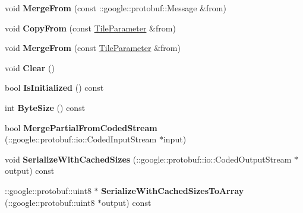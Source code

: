 \begin{DoxyCompactItemize}
void {\bfseries Merge\+From} (const \+::google\+::protobuf\+::\+Message \&from)
\item 
\mbox{\label{classcaffe_1_1_tile_parameter_af27dfd797341f31b2bee5f7fc8c348e7}} 
void {\bfseries Copy\+From} (const \mbox{\hyperlink{classcaffe_1_1_tile_parameter}{Tile\+Parameter}} \&from)
\item 
\mbox{\label{classcaffe_1_1_tile_parameter_aacbaec7650bb01c7d0d59372523c1df3}} 
void {\bfseries Merge\+From} (const \mbox{\hyperlink{classcaffe_1_1_tile_parameter}{Tile\+Parameter}} \&from)
\item 
\mbox{\label{classcaffe_1_1_tile_parameter_a7fba77cde4fec14435a2952eab535b62}} 
void {\bfseries Clear} ()
\item 
\mbox{\label{classcaffe_1_1_tile_parameter_a5b1913c75e58b26e7419bb8704f5d64e}} 
bool {\bfseries Is\+Initialized} () const
\item 
\mbox{\label{classcaffe_1_1_tile_parameter_ab3da1188e9cdfc7d8caee71db590a9c8}} 
int {\bfseries Byte\+Size} () const
\item 
\mbox{\label{classcaffe_1_1_tile_parameter_a9c9c8315e1be7193912828ce9f94c58e}} 
bool {\bfseries Merge\+Partial\+From\+Coded\+Stream} (\+::google\+::protobuf\+::io\+::\+Coded\+Input\+Stream $\ast$input)
\item 
\mbox{\label{classcaffe_1_1_tile_parameter_a80834c6845bc094534df01d173f0834c}} 
void {\bfseries Serialize\+With\+Cached\+Sizes} (\+::google\+::protobuf\+::io\+::\+Coded\+Output\+Stream $\ast$output) const
\item 
\mbox{\label{classcaffe_1_1_tile_parameter_a599cd35841de60b746b5828b4fae849e}} 
\+::google\+::protobuf\+::uint8 $\ast$ {\bfseries Serialize\+With\+Cached\+Sizes\+To\+Array} (\+::google\+::protobuf\+::uint8 $\ast$output) const
\item 
\mbox{\label{classcaffe_1_1_tile_parameter_a6036e6ff22db5759f32b4b5d6366e2a4}} 

\end{DoxyCompactItemize}
